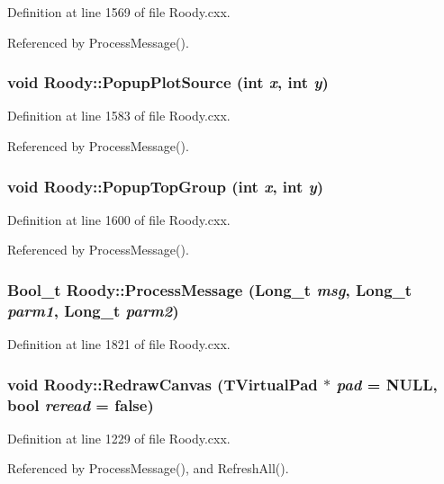 Definition at line 1569 of file Roody.cxx.

Referenced by ProcessMessage().
\subsubsection[{PopupPlotSource}]{\setlength{\rightskip}{0pt plus 5cm}void Roody::PopupPlotSource (int {\em x}, \/  int {\em y})}\label{classRoody_a8bb015140d68040713d28168506b933d}


Definition at line 1583 of file Roody.cxx.

Referenced by ProcessMessage().
\subsubsection[{PopupTopGroup}]{\setlength{\rightskip}{0pt plus 5cm}void Roody::PopupTopGroup (int {\em x}, \/  int {\em y})}\label{classRoody_a244f1781a79de822f8b1826f2bd46903}


Definition at line 1600 of file Roody.cxx.

Referenced by ProcessMessage().
\subsubsection[{ProcessMessage}]{\setlength{\rightskip}{0pt plus 5cm}Bool\_\-t Roody::ProcessMessage (Long\_\-t {\em msg}, \/  Long\_\-t {\em parm1}, \/  Long\_\-t {\em parm2})}\label{classRoody_a0faf43417375032465952294f6d23f47}


Definition at line 1821 of file Roody.cxx.
\subsubsection[{RedrawCanvas}]{\setlength{\rightskip}{0pt plus 5cm}void Roody::RedrawCanvas (TVirtualPad $\ast$ {\em pad} = {\ttfamily NULL}, \/  bool {\em reread} = {\ttfamily false})}\label{classRoody_a8ad5069ca505521a9e0581e69e0f5b04}


Definition at line 1229 of file Roody.cxx.

Referenced by ProcessMessage(), and RefreshAll().
